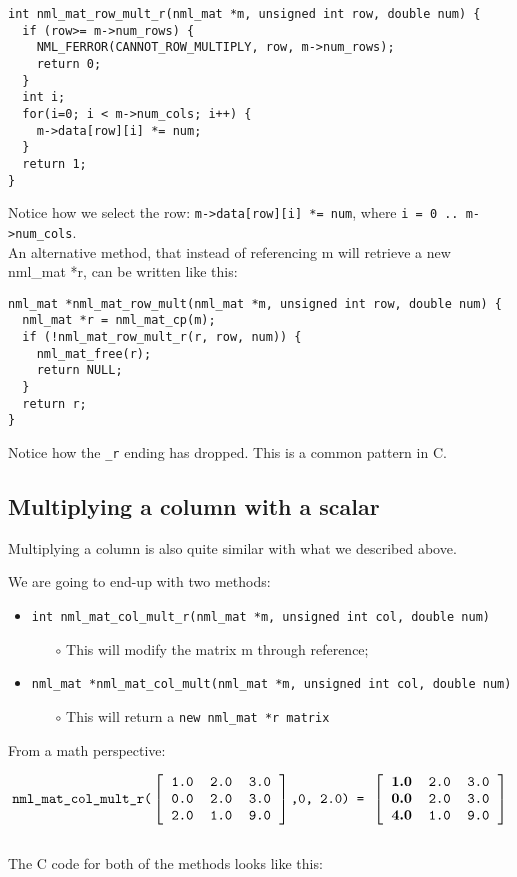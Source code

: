 \begin{verbatim}
int nml_mat_row_mult_r(nml_mat *m, unsigned int row, double num) {
  if (row>= m->num_rows) {
    NML_FERROR(CANNOT_ROW_MULTIPLY, row, m->num_rows);
    return 0;
  }
  int i;
  for(i=0; i < m->num_cols; i++) {
    m->data[row][i] *= num;
  }
  return 1;
}
\end{verbatim}
Notice how we select the row: {\tt m->data[row][i] *= num}, where {\tt i = 0 .. m->num\_cols}.
\\

An alternative method, that instead of referencing m will retrieve a new nml\_mat *r, can be written like this:

\begin{verbatim}
nml_mat *nml_mat_row_mult(nml_mat *m, unsigned int row, double num) {
  nml_mat *r = nml_mat_cp(m);
  if (!nml_mat_row_mult_r(r, row, num)) {
    nml_mat_free(r);
    return NULL;
  }
  return r;
} 
\end{verbatim}

Notice how the {\tt \_r} ending has dropped. This is a common pattern in C.

\subsection{Multiplying a column with a scalar}

Multiplying a column is also quite similar with what we described above.

We are going to end-up with two methods:

\begin{itemize}
\item {\tt int nml\_mat\_col\_mult\_r(nml\_mat *m, unsigned int col, double num)}
	\begin{itemize}
	\item[$\circ$] This will modify the matrix m through reference;
	\end{itemize}
\item {\tt nml\_mat *nml\_mat\_col\_mult(nml\_mat *m, unsigned int col, double num)}
	\begin{itemize}
	\item[$\circ$] This will return a {\tt new nml\_mat *r matrix}
	\end{itemize}
\end{itemize}
From a math perspective:

$$
\texttt{nml\_mat\_col\_mult\_r(}
\left[ \begin{tabular}{rrr}
\tt 1.0 & \tt 2.0 & \tt 3.0 \\
\tt 0.0 & \tt 2.0 & \tt 3.0 \\
\tt 2.0 & \tt 1.0 & \tt 9.0
\end{tabular} \right]
\texttt{,0, 2.0) = }
\left[ \begin{tabular}{rrr}
\tt\bf 1.0 & \tt 2.0 & \tt 3.0 \\
\tt\bf 0.0 & \tt 2.0 & \tt 3.0 \\
\tt\bf 4.0 & \tt 1.0 & \tt 9.0
\end{tabular} \right]
$$
\\
The C code for both of the methods looks like this:

